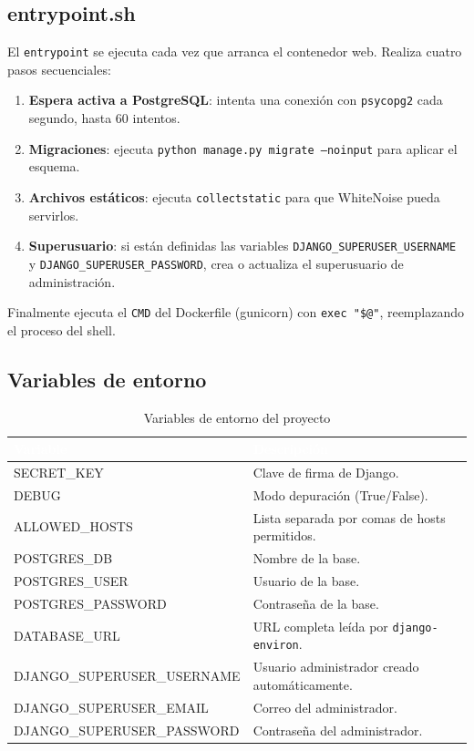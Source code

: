\documentclass[12pt,a4paper]{article}
\begin{document}
\subsection{entrypoint.sh}

El \texttt{entrypoint} se ejecuta cada vez que arranca el contenedor web. Realiza cuatro pasos secuenciales:

\begin{enumerate}
    \item \textbf{Espera activa a PostgreSQL}: intenta una conexión con \texttt{psycopg2} cada segundo, hasta 60 intentos.
    \item \textbf{Migraciones}: ejecuta \texttt{python manage.py migrate --noinput} para aplicar el esquema.
    \item \textbf{Archivos estáticos}: ejecuta \texttt{collectstatic} para que WhiteNoise pueda servirlos.
    \item \textbf{Superusuario}: si están definidas las variables \texttt{DJANGO\_SUPERUSER\_USERNAME} y \texttt{DJANGO\_SUPERUSER\_PASSWORD}, crea o actualiza el superusuario de administración.
\end{enumerate}

Finalmente ejecuta el \texttt{CMD} del Dockerfile (gunicorn) con \texttt{exec "\$@"}, reemplazando el proceso del shell.

\subsection{Variables de entorno}

\begin{table}[H]
\centering
\renewcommand{\arraystretch}{1.3}
\begin{tabularx}{\textwidth}{|>{\ttfamily\small}p{5.3cm}|X|}
\hline
\rowcolor[RGB]{25,55,109}
\textcolor{white}{\textbf{Variable}} & \textcolor{white}{\textbf{Descripción}} \\
\hline
SECRET\_KEY & Clave de firma de Django. \\
\hline
DEBUG & Modo depuración (True/False). \\
\hline
ALLOWED\_HOSTS & Lista separada por comas de hosts permitidos. \\
\hline
POSTGRES\_DB & Nombre de la base. \\
\hline
POSTGRES\_USER & Usuario de la base. \\
\hline
POSTGRES\_PASSWORD & Contraseña de la base. \\
\hline
DATABASE\_URL & URL completa leída por \texttt{django-environ}. \\
\hline
DJANGO\_SUPERUSER\_USERNAME & Usuario administrador creado automáticamente. \\
\hline
DJANGO\_SUPERUSER\_EMAIL & Correo del administrador. \\
\hline
DJANGO\_SUPERUSER\_PASSWORD & Contraseña del administrador. \\
\hline
\end{tabularx}
\caption{Variables de entorno del proyecto}
\end{table}
\end{document}
